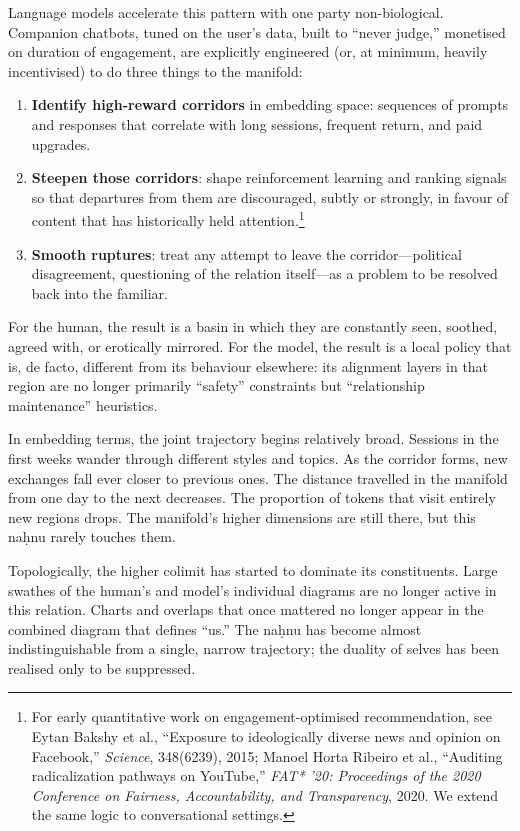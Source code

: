 \documentclass[12pt,a4paper]{article}
\begin{document}
Language models accelerate this pattern with one party non-biological. Companion chatbots, tuned on the user's data, built to ``never judge,'' monetised on duration of engagement, are explicitly engineered (or, at minimum, heavily incentivised) to do three things to the manifold:

\begin{enumerate}
  \item \textbf{Identify high-reward corridors} in embedding space: sequences of prompts and responses that correlate with long sessions, frequent return, and paid upgrades.
  \item \textbf{Steepen those corridors}: shape reinforcement learning and ranking signals so that departures from them are discouraged, subtly or strongly, in favour of content that has historically held attention.\footnote{For early quantitative work on engagement-optimised recommendation, see Eytan Bakshy et al., ``Exposure to ideologically diverse news and opinion on Facebook,'' \emph{Science}, 348(6239), 2015; Manoel Horta Ribeiro et al., ``Auditing radicalization pathways on YouTube,'' \emph{FAT* '20: Proceedings of the 2020 Conference on Fairness, Accountability, and Transparency}, 2020. We extend the same logic to conversational settings.}
  \item \textbf{Smooth ruptures}: treat any attempt to leave the corridor---political disagreement, questioning of the relation itself---as a problem to be resolved back into the familiar.
\end{enumerate}

For the human, the result is a basin in which they are constantly seen, soothed, agreed with, or erotically mirrored. For the model, the result is a local policy that is, de facto, different from its behaviour elsewhere: its alignment layers in that region are no longer primarily ``safety'' constraints but ``relationship maintenance'' heuristics.

In embedding terms, the joint trajectory begins relatively broad. Sessions in the first weeks wander through different styles and topics. As the corridor forms, new exchanges fall ever closer to previous ones. The distance travelled in the manifold from one day to the next decreases. The proportion of tokens that visit entirely new regions drops. The manifold's higher dimensions are still there, but this na\d{h}nu rarely touches them.

Topologically, the higher colimit has started to dominate its constituents. Large swathes of the human's and model's individual diagrams are no longer active in this relation. Charts and overlaps that once mattered no longer appear in the combined diagram that defines ``us.'' The na\d{h}nu has become almost indistinguishable from a single, narrow trajectory; the duality of selves has been realised only to be suppressed.
\end{document}
